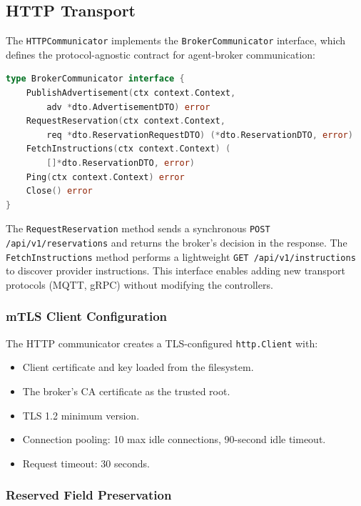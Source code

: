 \subsection{HTTP Transport}
\label{subsec:http-client}

The \texttt{HTTPCommunicator} implements the \texttt{BrokerCommunicator} interface, which defines the protocol-agnostic contract for agent-broker communication:

\begin{lstlisting}[language=Go, caption={BrokerCommunicator interface}, label={lst:communicator}]
type BrokerCommunicator interface {
    PublishAdvertisement(ctx context.Context,
        adv *dto.AdvertisementDTO) error
    RequestReservation(ctx context.Context,
        req *dto.ReservationRequestDTO) (*dto.ReservationDTO, error)
    FetchInstructions(ctx context.Context) (
        []*dto.ReservationDTO, error)
    Ping(ctx context.Context) error
    Close() error
}
\end{lstlisting}

The \texttt{RequestReservation} method sends a synchronous \texttt{POST /api/v1/reservations} and returns the broker's decision in the response. The \texttt{FetchInstructions} method performs a lightweight \texttt{GET /api/v1/instructions} to discover provider instructions. This interface enables adding new transport protocols (MQTT, gRPC) without modifying the controllers.

\subsubsection{mTLS Client Configuration}

The HTTP communicator creates a TLS-configured \texttt{http.Client} with:
\begin{itemize}
    \item Client certificate and key loaded from the filesystem.
    \item The broker's CA certificate as the trusted root.
    \item TLS 1.2 minimum version.
    \item Connection pooling: 10 max idle connections, 90-second idle timeout.
    \item Request timeout: 30 seconds.
\end{itemize}

\subsubsection{Reserved Field Preservation}


